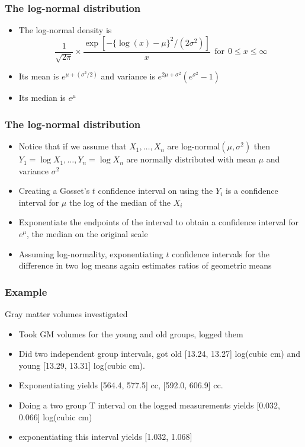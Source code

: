 \documentclass[aspectratio=169]{beamer}
\begin{document}
\begin{frame}\frametitle{The log-normal distribution}
\begin{itemize}
\item The log-normal density is
$$
\frac{1}{\sqrt{2\pi}} \times \frac{\exp[-\{\log(x) - \mu\}^2/ (2\sigma^2)]}{x}
~~\mbox{for}~~ 0\leq x \leq \infty
$$
\item Its mean is $e^{\mu + (\sigma^2 / 2)}$ and variance is $e^{2\mu + \sigma^2}(e^{ \sigma^2} - 1)$
\item Its median is $e^\mu$
\end{itemize}
\end{frame}

\begin{frame}\frametitle{The log-normal distribution}
\begin{itemize}
\item Notice that if we assume that $X_1,\ldots,X_n$ are 
   log-normal$(\mu,\sigma^2)$
  then $Y_1 = \log X_1,\ldots, Y_n = \log X_n$ are normally distributed
  with mean $\mu$ and variance $\sigma^2$
\item Creating a Gosset's $t$ confidence interval on using the $Y_i$
  is a confidence interval for $\mu$ the log of the median of the
  $X_i$
\item Exponentiate the endpoints of the interval to obtain a confidence interval
  for $e^\mu$, the median on the original scale
\item Assuming log-normality, exponentiating $t$ confidence intervals
  for the difference in two log means again estimates ratios of geometric
  means 
\end{itemize}
\end{frame}

\begin{frame}\frametitle{Example}
Gray matter volumes investigated
\begin{itemize}
\item Took GM volumes for the young and old groups, logged them
\item Did two independent group intervals, got 
old [13.24, 13.27] log(cubic cm) and young [13.29, 13.31] log(cubic cm).
\item  Exponentiating yields [564.4, 577.5] cc, [592.0, 606.9] cc.
\item Doing a two group T interval on the logged measurements yields [0.032, 0.066] log(cubic cm)
\item exponentiating this interval yields [1.032, 1.068]
\end{itemize}
\end{frame}
\end{document}
